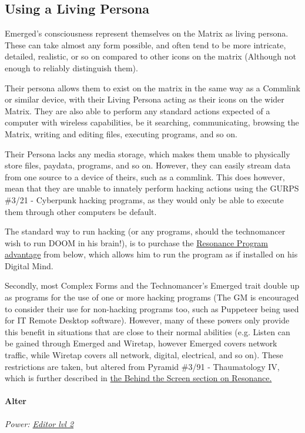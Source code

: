 \begin{multicols*}{3}
	\subsection{Using a Living Persona}
	
	Emerged's consciousness represent themselves  on the Matrix as living persona. These can take almost any form possible, and often tend to be more intricate, detailed, realistic, or so on compared to other icons on the matrix (Although not enough to reliably distinguish them). 
	
	Their persona allows them to exist on the matrix in the same way as a Commlink or similar device, with their Living Persona acting as their icons on the wider Matrix. They are also able to perform any standard actions expected of a computer with wireless capabilities, be it searching, communicating, browsing the Matrix, writing and editing files, executing programs, and so on. 
	
	Their Persona lacks any media storage, which makes them unable to physically store files, paydata, programs, and so on. However, they can easily stream data from one source to a device of theirs, such as a commlink. This does however, mean that they are unable to innately perform hacking actions using the GURPS \#3/21 - Cyberpunk hacking programs, as they would only be able to execute them through other computers be default.
	
	The standard way to run hacking (or any programs, should the technomancer wish to run DOOM in his brain!), is to purchase the \hyperref[resonance_program]{Resonance Program advantage} from below, which allows him to run the program as if installed on his Digital Mind.
	
	Secondly, most Complex Forms and the Technomancer's Emerged trait double up as programs for the use of one or more hacking programs (The GM is encouraged to consider their use for non-hacking programs too, such as Puppeteer being used for IT Remote Desktop software). However, many of these powers only provide this benefit in situations that are close to their normal abilities (e.g. Listen can be gained through Emerged and Wiretap, however Emerged covers network traffic, while Wiretap covers all network, digital, electrical, and so on). These restrictions are taken, but altered from Pyramid \#3/91 - Thaumatology IV, which is further described in \hyperref[behind_the_screen]{the Behind the Screen section on Resonance.}
	
	\paragraph{Alter}
	\begin{center}
		\textit{Power: \hyperref[editor]{Editor lvl 2}}
	\end{center}


\end{multicols*}
